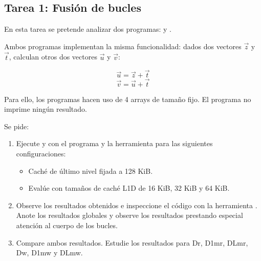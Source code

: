 \clearpage
\subsection{Tarea 1: Fusión de bucles}

En esta tarea se pretende analizar dos programas:  y .




Ambos programas implementan la misma funcionalidad:
dados dos vectores $\vec{z}$ y $\vec{t}$, calculan otros dos vectores $\vec{u}$ y $\vec{v}$:

\[
\vec{u} = \vec{z} + \vec{t}
\]
\[
\vec{v} = \vec{u} + \vec{t}
\]

Para ello, los programas hacen uso de 4 arrays de tamaño fijo.
El programa no imprime ningún resultado.

Se pide: 

\begin{enumerate}

\item Ejecute  y  con el programa
 y la herramienta  para las
siguientes configuraciones:

\begin{itemize}
\item Caché de último nivel fijada a 128 KiB.
\item Evalúe con tamaños de caché L1D de 16 KiB, 32 KiB y 64 KiB.
\end{itemize}

\item Observe los resultados obtenidos e inspeccione el código con la
herramienta . Anote los resultados globales y observe los
resultados prestando especial atención al cuerpo de los bucles.

\item Compare ambos resultados.
Estudie los resultados para Dr, D1mr, DLmr, Dw,
D1mw y DLmw.
 
\end{enumerate}

